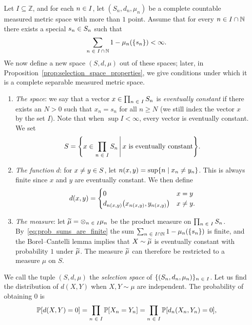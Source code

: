 \documentclass[10pt]{amsart}
\theoremstyle{definition}\newtheorem{defi}[theo]{Definition}\newtheorem{rema}[theo]{Remark}\newtheorem{exam}[theo]{Example}\newtheorem{exem}[theo]{Example}\newtheorem{nota}[theo]{Notation}
\newcommand*\n{\mathbb{N}}
\newcommand*\z{\mathbb{Z}}
\newcommand*\p{\mathbb{P}}
\newcommand*\tensor{\otimes}
\newcommand*\indexx[2]{n\left(#1,#2\right)}
\newcommand*\intersect{\cap}
\let\originalleft\left
\let\originalright\right
\renewcommand{\left}{\mathopen{}\mathclose\bgroup\originalleft}
\renewcommand{\right}{\aftergroup\egroup\originalright}
\let\oldin\in
\renewcommand{\in}{\mathchoice{\oldin}{\oldin}{\,\oldin\,}{\,\oldin\,}}
\let\oldtilde\tilde
\renewcommand*{\tilde}[1]{\mathchoice{\widetilde{#1}}{\widetilde{#1}}{\oldtilde{#1}}{\oldtilde{#1}}}
\begin{document}
Let $I\subseteq\z$, and for each $n\in I$, let $(S_{n},d_{n},\mu_{n})$ be a complete countable measured metric space with more than $1$ point. Assume that for every $n\in I\intersect\n$ there exists a special $s_{n}\in S_{n}$ such that
\begin{equation}\label{eq:prob_sums_are_finite}
\sum_{n\in I\,\intersect\,\n}1-\mu_{n}\left(\left\{ s_{n}\right\} \right)<\infty.
\end{equation}
We now define a new space $(S,d,\mu)$ out of these spaces; later, in Proposition~\ref{prop:selection_space_properties}, we give conditions under which it is a complete separable measured metric space.
\begin{enumerate}
\item \emph{The space}: we say that a vector $x\in\prod_{n\in I}S_{n}$ is \emph{eventually constant} if there exists an $N>0$ such that $x_{n}=s_{n}$ for all $n\geq N$ (we still index the vector $x$ by the set $I$). Note that when $\sup I<\infty$, every vector is eventually constant. We set
\[
S=\left\{ x\in\prod_{n\in I}S_{n}\,\middle| \,x\text{ is eventually constant}\right\}.
\]
\item \emph{The function }$d$: for $x\neq y\in S$, let $\indexx xy=\sup\{ n\mid x_{n}\neq y_{n}\} $. This is always finite since $x$ and $y$ are eventually constant. We then define
\[
d\left(x,y\right)=
\begin{cases}
0 & x=y\\
d_{\indexx xy}\left(x_{\indexx xy},y_{\indexx xy}\right) & x\neq y.
\end{cases}
\]
\item \emph{The measure}: let $\tilde{\mu}=\tensor_{n\in I}\mu_{n}$ be the product measure on $\prod_{n\in I}S_{n}$. By~\eqref{eq:prob_sums_are_finite} the sum $\sum_{n\in I\intersect\n}1-\mu_{n}(\{ s_{n}\} )$ is finite, and the Borel--Cantelli lemma implies that $X\sim\tilde{\mu}$ is eventually constant with probability $1$ under $\tilde{\mu}$. The measure $\tilde{\mu}$ can therefore be restricted to a measure $\mu$ on $S$.
\end{enumerate}
We call the tuple $(S,d,\mu)$ the \emph{selection space} of $\{ (S_{n},d_{n},\mu_{n})\} _{n\in I}$. Let us find the distribution of $d(X,Y)$ when $X,Y\sim\mu$ are independent. The probability of obtaining $0$ is
\begin{equation}\label{eq:prob_of_0}
\p\left[d\left(X,Y\right)=0\right]=\prod_{n\in I}\p\left[X_{n}=Y_{n}\right]=\prod_{n\in I}\p\left[d_{n}\left(X_{n},Y_{n}\right)=0\right],
\end{equation}
\end{document}
